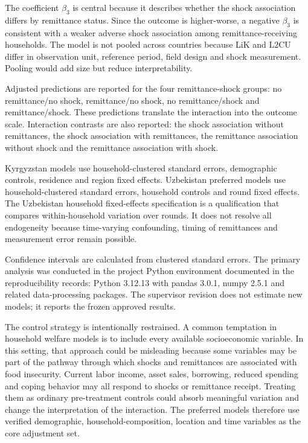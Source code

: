 \documentclass[11pt]{article}
\begin{document}
The coefficient \(\beta_3\) is central because it describes whether the shock association differs by remittance status. Since the outcome is higher-worse, a negative \(\beta_3\) is consistent with a weaker adverse shock association among remittance-receiving households. The model is not pooled across countries because LiK and L2CU differ in observation unit, reference period, field design and shock measurement. Pooling would add size but reduce interpretability.

Adjusted predictions are reported for the four remittance-shock groups: no remittance/no shock, remittance/no shock, no remittance/shock and remittance/shock. These predictions translate the interaction into the outcome scale. Interaction contrasts are also reported: the shock association without remittances, the shock association with remittances, the remittance association without shock and the remittance association with shock.

Kyrgyzstan models use household-clustered standard errors, demographic controls, residence and region fixed effects. Uzbekistan preferred models use household-clustered standard errors, household controls and round fixed effects. The Uzbekistan household fixed-effects specification is a qualification that compares within-household variation over rounds. It does not resolve all endogeneity because time-varying confounding, timing of remittances and measurement error remain possible.

Confidence intervals are calculated from clustered standard errors. The primary analysis was conducted in the project Python environment documented in the reproducibility records: Python 3.12.13 with pandas 3.0.1, numpy 2.5.1 and related data-processing packages. The supervisor revision does not estimate new models; it reports the frozen approved results.

The control strategy is intentionally restrained. A common temptation in household welfare models is to include every available socioeconomic variable. In this setting, that approach could be misleading because some variables may be part of the pathway through which shocks and remittances are associated with food insecurity. Current labor income, asset sales, borrowing, reduced spending and coping behavior may all respond to shocks or remittance receipt. Treating them as ordinary pre-treatment controls could absorb meaningful variation and change the interpretation of the interaction. The preferred models therefore use verified demographic, household-composition, location and time variables as the core adjustment set.
\end{document}
